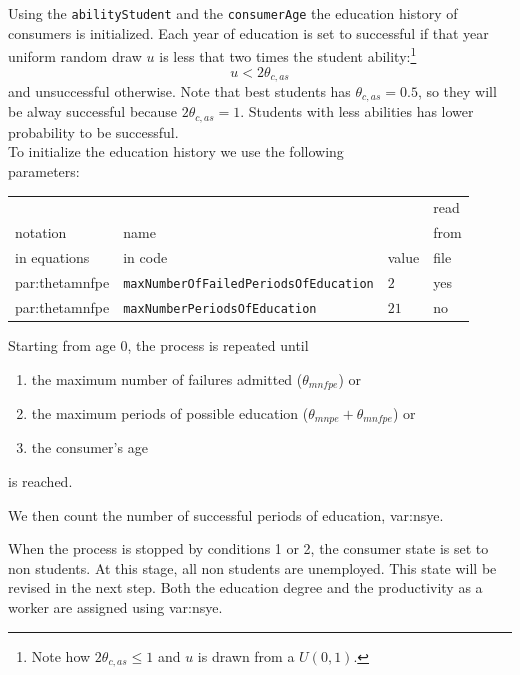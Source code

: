 \documentclass{book}
\begin{document}
\vskip5mm
Using the \verb+abilityStudent+ and the \verb+consumerAge+ the education history of consumers is initialized. Each year of education is set to successful if that year uniform random draw $u$ is less that two times the student ability:\footnote{Note how $2\theta_{c,as}\le 1$ and $u$ is drawn from a $U(0,1)$.}
\[
	u<2\theta_{c,as}
\]
and unsuccessful otherwise.  Note that best students has $\theta_{c,as}=0.5$, so they will be alway successful because $2\theta_{c,as}=1$. Students with less abilities has lower probability to be successful.\\

To initialize the education history we use the following\\ 
parameters:\\

\noindent
\begin{tabular}{l l l l}
	\hline
	& &&read\\
	notation& name &&from\\
	in equations& in code&value&file\\
	\hline
	\hline
\gls{par:thetamnfpe}&\verb+maxNumberOfFailedPeriodsOfEducation+&$2$&yes\\
\gls{par:thetamnfpe}&\verb+maxNumberPeriodsOfEducation+&$21$&no\\
	\hline
\end{tabular}

\vskip5mm


Starting from age 0, the process is repeated until 
\begin{enumerate}
	\item the maximum number of failures admitted ($\theta_{mnfpe}$) or
	\item the maximum periods of possible education ($\theta_{mnpe}+\theta_{mnfpe}$) or
	\item the consumer's age 
\end{enumerate}
is reached.

We then count the number of successful periods of education, \gls{var:nsye}. 

When the process is stopped by conditions 1 or 2, the consumer state is set to non students. At this stage, all non students are unemployed. This state will be revised in the next step. Both the education degree and the productivity as a worker are assigned using \gls{var:nsye}. 
\end{document}
